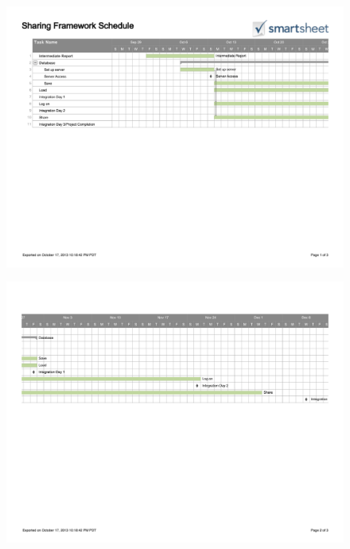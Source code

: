 \documentclass[12pt]{article}
\begin{document}
\begin{figure}
 \centerline{\includegraphics[scale=0.75]{sharingframework-sfs.pdf}}
\end{figure}

\begin{figure}
 \centerline{\includegraphics[scale=0.75]{sharingframework-sfs2.pdf}}
\end{figure}
\end{document}
